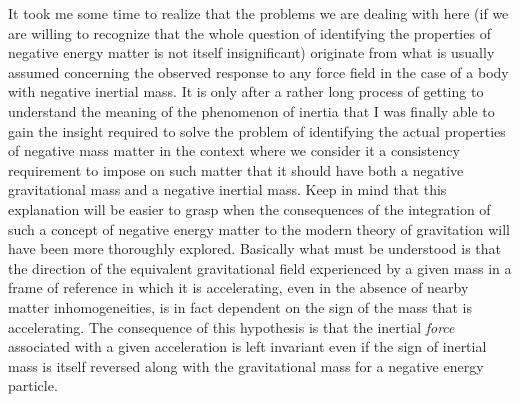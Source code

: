 \documentclass[notitlepage,12pt]{report}
\begin{document}
It took me some time to realize that the problems we are dealing with here (if we are willing to recognize that the whole question of identifying the properties of negative energy matter is not itself insignificant) originate from what is usually assumed concerning the observed response to any force field in the case of a body with negative inertial mass. It is only after a rather long process of getting to understand the meaning of the phenomenon of inertia that I was finally able to gain the insight required to solve the problem of identifying the actual properties of negative mass matter in the context where we consider it a consistency requirement to impose on such matter that it should have both a negative gravitational mass and a negative inertial mass. Keep in mind that this explanation will be easier to grasp when the consequences of the integration of such a concept of negative energy matter to the modern theory of gravitation will have been more thoroughly explored. Basically what must be understood is that the direction of the equivalent gravitational field experienced by a given mass in a frame of reference in which it is accelerating, even in the absence of nearby matter inhomogeneities, is in fact dependent on the sign of the mass that is accelerating. The consequence of this hypothesis is that the inertial \textit{force} associated with a given acceleration is left invariant even if the sign of inertial mass is itself reversed along with the gravitational mass for a negative energy particle.
\end{document}
